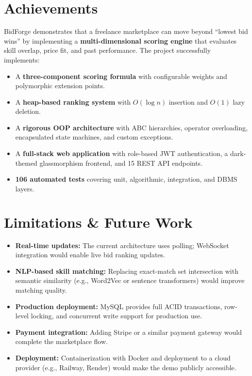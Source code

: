 \documentclass[12pt, a4paper]{report}
\begin{document}
\section{Achievements}

BidForge demonstrates that a freelance marketplace can move beyond ``lowest bid wins'' by implementing a \textbf{multi-dimensional scoring engine} that evaluates skill overlap, price fit, and past performance. The project successfully implements:

\begin{itemize}
  \item A \textbf{three-component scoring formula} with configurable weights and polymorphic extension points.
  \item A \textbf{heap-based ranking system} with $O(\log n)$ insertion and $O(1)$ lazy deletion.
  \item A \textbf{rigorous OOP architecture} with ABC hierarchies, operator overloading, encapsulated state machines, and custom exceptions.
  \item A \textbf{full-stack web application} with role-based JWT authentication, a dark-themed glassmorphism frontend, and 15 REST API endpoints.
  \item \textbf{106 automated tests} covering unit, algorithmic, integration, and DBMS layers.
\end{itemize}

\section{Limitations \& Future Work}

\begin{itemize}
  \item \textbf{Real-time updates:} The current architecture uses polling; WebSocket integration would enable live bid ranking updates.
  \item \textbf{NLP-based skill matching:} Replacing exact-match set intersection with semantic similarity (e.g., Word2Vec or sentence transformers) would improve matching quality.
  \item \textbf{Production deployment:} MySQL provides full ACID transactions, row-level locking, and concurrent write support for production use.
  \item \textbf{Payment integration:} Adding Stripe or a similar payment gateway would complete the marketplace flow.
  \item \textbf{Deployment:} Containerization with Docker and deployment to a cloud provider (e.g., Railway, Render) would make the demo publicly accessible.
\end{itemize}
\end{document}
